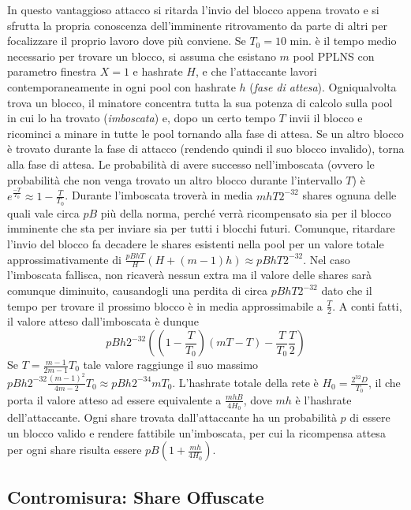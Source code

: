 In questo vantaggioso attacco si ritarda l'invio del blocco appena trovato e si sfrutta la propria conoscenza dell'imminente ritrovamento da parte di altri per focalizzare il proprio lavoro dove più conviene.
Se $T_0 = 10$ min. è il tempo medio necessario per trovare un blocco, si assuma che esistano $m$ pool PPLNS con parametro finestra $X=1$ e hashrate $H$, e che l'attaccante lavori contemporaneamente in ogni pool con hashrate $h$ (\emph{fase di attesa}). Ogniqualvolta trova un blocco, il minatore concentra tutta la sua potenza di calcolo sulla pool in cui lo ha trovato (\emph{imboscata}) e, dopo un certo tempo $T$ invii il blocco e ricominci a minare in tutte le pool tornando alla fase di attesa. Se un altro blocco è trovato durante la fase di attacco (rendendo quindi il suo blocco invalido), torna alla fase di attesa.
Le probabilità di avere successo nell'imboscata (ovvero le probabilità che non venga trovato un altro blocco durante l'intervallo $T$) è $e^\frac{-T}{T_0} \approx 1 - \frac{T}{T_0}$. Durante l'imboscata troverà in media $mhT2^{-32}$ shares ognuna delle quali vale circa $pB$ più della norma, perché verrà ricompensato sia per il blocco imminente che sta per inviare sia per tutti i blocchi futuri. Comunque, ritardare l'invio del blocco fa decadere le shares esistenti nella pool per un valore totale approssimativamente di $\frac{pBhT}{H}(H + (m-1)h) \approx pBhT2^{-32}$. Nel caso l'imboscata fallisca, non ricaverà nessun extra ma il valore delle shares sarà comunque diminuito, causandogli una perdita di circa $pBhT2^{-32}$ dato che il tempo per trovare il prossimo blocco è in media approssimabile a $\frac{T}{2}$.
A conti fatti, il valore atteso dall'imboscata è dunque
\[pBh2^{-32}\left(\left(1-\frac{T}{T_0}\right)\left(mT-T\right) - \frac{T}{T_0}\frac{T}{2}\right)\]
Se $T=\frac{m-1}{2m-1}T_0$ tale valore raggiunge il suo massimo $pBh2^{-32}\frac{(m-1)^2}{4m-2}T_0 \approx pBh2^{-34}mT_0$. L'hashrate totale della rete è $H_0=\frac{2^{32}D}{T_0}$, il che porta il valore atteso ad essere equivalente a $\frac{mhB}{4H_0}$, dove $mh$ è l'hashrate dell'attaccante.
Ogni share trovata dall'attaccante ha un probabilità $p$ di essere un blocco valido e rendere fattibile un'imboscata, per cui la ricompensa attesa per ogni share risulta essere $pB\left(1 + \frac{mh}{4H_0}\right)$.

\subsection{Contromisura: Share Offuscate}

